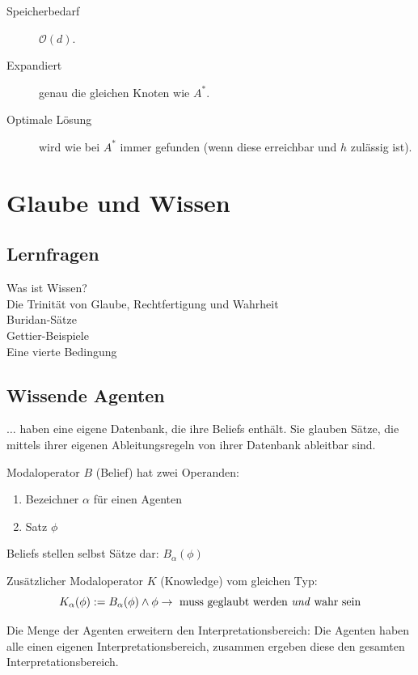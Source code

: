 \documentclass[runningheads,deutsch]{llncs}
\begin{document}
\begin{description}
    \item[Speicherbedarf] $\mathcal O(d)$.
    \item[Expandiert] genau die gleichen Knoten wie $A^*$.
    \item[Optimale Lösung] wird wie bei $A^*$ immer gefunden (wenn diese erreichbar und $h$ zulässig ist).
\end{description}


\section{Glaube und Wissen}

\subsection{Lernfragen}
\begin{description}
    \item[Was ist Wissen?]
    \item[Die Trinität von Glaube, Rechtfertigung und Wahrheit]
    \item[Buridan-Sätze]
    \item[Gettier-Beispiele]
    \item[Eine vierte Bedingung]
\end{description}

\subsection{Wissende Agenten}
$\dots$ haben eine eigene Datenbank, die ihre Beliefs enthält. Sie glauben Sätze, die mittels ihrer eigenen Ableitungsregeln von ihrer Datenbank ableitbar sind.

Modaloperator $B$ (Belief) hat zwei Operanden:

\begin{enumerate}
    \item Bezeichner $\alpha$ für einen Agenten
    \item Satz $\phi$
\end{enumerate}

Beliefs stellen selbst Sätze dar: $B_{\alpha}(\phi)$

Zusätzlicher Modaloperator $K$ (Knowledge) vom gleichen Typ:
\[ K_{\alpha}(\phi) := B_{\alpha}(\phi) \land \phi \rightarrow \text{ muss geglaubt werden \textit{und} wahr sein} \]

Die Menge der Agenten erweitern den Interpretationsbereich: Die Agenten haben alle einen eigenen Interpretationsbereich, zusammen ergeben diese den gesamten Interpretationsbereich.
\end{document}
